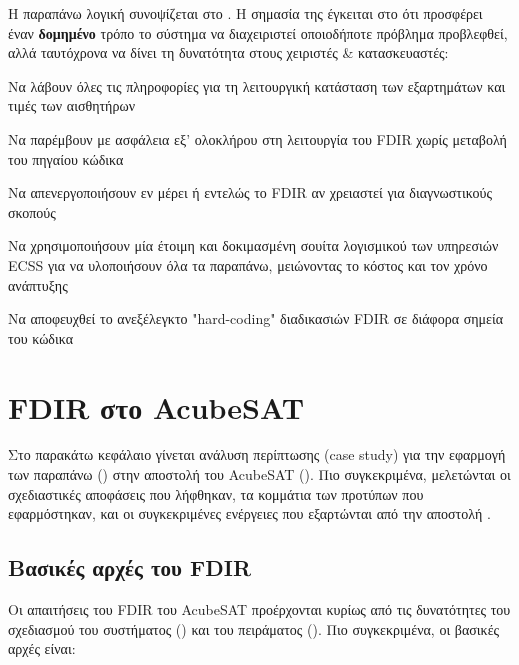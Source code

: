 \documentclass[a4paper,nobib]{tufte-book}
\begin{document}
Η παραπάνω λογική συνοψίζεται στο . Η σημασία της έγκειται στο ότι προσφέρει έναν \textbf{δομημένο} τρόπο το σύστημα να διαχειριστεί οποιοδήποτε πρόβλημα προβλεφθεί, αλλά ταυτόχρονα να δίνει τη δυνατότητα στους χειριστές \& κατασκευαστές:
\begin{compactitem}
	\item Να λάβουν όλες τις πληροφορίες για τη λειτουργική κατάσταση των εξαρτημάτων και τιμές των αισθητήρων
	\item Να παρέμβουν με ασφάλεια εξ' ολοκλήρου στη λειτουργία του \acs{FDIR} χωρίς μεταβολή του πηγαίου κώδικα
	\item Να απενεργοποιήσουν εν μέρει ή εντελώς το \acs{FDIR} αν χρειαστεί για διαγνωστικούς σκοπούς
	\item Να χρησιμοποιήσουν μία έτοιμη και δοκιμασμένη σουίτα λογισμικού των υπηρεσιών \acs{ECSS} για να υλοποιήσουν όλα τα παραπάνω, μειώνοντας το κόστος και τον χρόνο ανάπτυξης
	\item Να αποφευχθεί το ανεξέλεγκτο "hard-coding" διαδικασιών \acs{FDIR} σε διάφορα σημεία του κώδικα
\end{compactitem}


\chapter{\acs{FDIR} στο AcubeSAT}
\label{cap:acufdir}

Στο παρακάτω κεφάλαιο γίνεται ανάλυση περίπτωσης (case study) για την εφαρμογή των παραπάνω () στην αποστολή του AcubeSAT (). Πιο συγκεκριμένα, μελετώνται οι σχεδιαστικές αποφάσεις που λήφθηκαν, τα κομμάτια των προτύπων που εφαρμόστηκαν, και οι συγκεκριμένες ενέργειες που εξαρτώνται από την αποστολή \autocite{FMEA}.

\section{Βασικές αρχές του \acs{FDIR}}
\label{sec:fdirbaspri}

Οι απαιτήσεις του \acs{FDIR} του AcubeSAT προέρχονται κυρίως από τις δυνατότητες του σχεδιασμού του συστήματος () και του πειράματος (). Πιο συγκεκριμένα, οι βασικές αρχές είναι:
\end{document}
